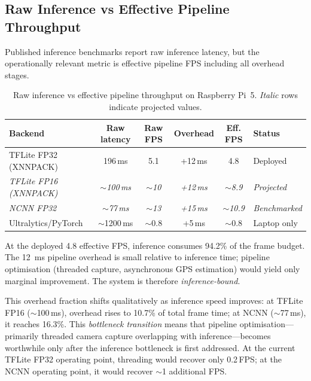 \documentclass[10pt,a4paper]{article}
\begin{document}
\subsection{Raw Inference vs Effective Pipeline Throughput}

Published inference benchmarks report raw inference latency, but the operationally relevant metric is effective pipeline FPS including all overhead stages.

\begin{table}[ht]
  \centering
  \caption{Raw inference vs effective pipeline throughput on Raspberry Pi~5. \emph{Italic} rows indicate projected values.}\label{tab:pipeline-fps}
  \begin{tabular}{@{}l c c c c l@{}}
    \toprule
    \textbf{Backend} & \textbf{Raw latency} & \textbf{Raw FPS} & \textbf{Overhead} & \textbf{Eff. FPS} & \textbf{Status} \\
    \midrule
    TFLite FP32 (XNNPACK) & 196\,ms & 5.1 & +12\,ms & 4.8 & Deployed \\
    \textit{TFLite FP16 (XNNPACK)} & \textit{${\sim}$100\,ms} & \textit{${\sim}$10} & \textit{+12\,ms} & \textit{${\sim}$8.9} & \textit{Projected} \\
    \textit{NCNN FP32}              & \textit{${\sim}$77\,ms}  & \textit{${\sim}$13} & \textit{+15\,ms} & \textit{${\sim}$10.9} & \textit{Benchmarked} \\
    Ultralytics/PyTorch    & ${\sim}$1200\,ms & ${\sim}$0.8 & +5\,ms & ${\sim}$0.8 & Laptop only \\
    \bottomrule
  \end{tabular}
\end{table}

At the deployed 4.8 effective FPS, inference consumes 94.2\% of the frame budget. The \SI{12}{\milli\second} pipeline overhead is small relative to inference time; pipeline optimisation (threaded capture, asynchronous GPS estimation) would yield only marginal improvement. The system is therefore \emph{inference-bound}.

This overhead fraction shifts qualitatively as inference speed improves: at TFLite FP16 (${\sim}$100\,ms), overhead rises to 10.7\% of total frame time; at NCNN (${\sim}$77\,ms), it reaches 16.3\%. This \emph{bottleneck transition} means that pipeline optimisation---primarily threaded camera capture overlapping with inference---becomes worthwhile only after the inference bottleneck is first addressed. At the current TFLite FP32 operating point, threading would recover only 0.2\,FPS; at the NCNN operating point, it would recover ${\sim}$1 additional FPS.
\end{document}
